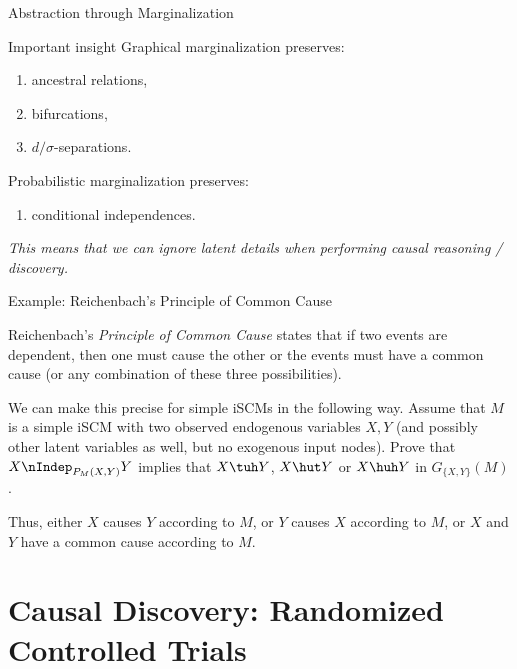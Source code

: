 \begin{frame}{Abstraction through Marginalization}
  \begin{block}{Important insight}
  Graphical marginalization preserves:
    \begin{enumerate}
      \item ancestral relations, 
      \item bifurcations, 
      \item $d/\sigma$-separations.
    \end{enumerate}
  Probabilistic marginalization preserves:
    \begin{enumerate}
      \item conditional independences.
    \end{enumerate}
    \emph{This means that we can ignore latent details when performing causal reasoning / discovery.}
  \end{block}
\end{frame}

\begin{frame}{Example: Reichenbach's Principle of Common Cause}
\begin{Exc}
  Reichenbach's \emph{Principle of Common Cause} states that if two events are dependent,
  then one must cause the other or the events must have a common cause (or any combination of these three possibilities).

  \bigskip
  We can make this precise for simple iSCMs in the following way. Assume that $M$
  is a simple iSCM with two observed endogenous variables $X,Y$ (and possibly other
  latent variables as well, but no exogenous input nodes). Prove that 
  $X \nIndep_{P_{M}(X,Y)} Y$
  implies that $X \tuh Y$,
  $X \hut Y$ or $X \huh Y$ in $G_{\{X,Y\}}(M)$.

  \bigskip
  Thus, either $X$ causes $Y$ according to $M$, 
  or $Y$ causes $X$ according to $M$,
  or $X$ and $Y$ have a common cause according to $M$.
\end{Exc}
\end{frame}


\part{Causal Discovery: Randomized Controlled Trials}
\frame{\partpage}

